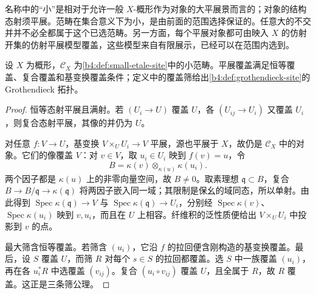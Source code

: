 名称中的“小”是相对于允许一般 \(X\)-概形作为对象的大平展景而言的；对象的结构态射须平展。范畴在集合意义下为小，是由前面的范围选择保证的。任意大的不交并并不必全都属于这个已选范畴。另一方面，每个平展对象都可由映入 \(X\) 的仿射开集的仿射平展模型覆盖，这些模型来自有限展示，已经可以在范围内选到。

\begin{proposition}\label{b4:prop:etale-covering-topology}
	设 \(X\) 为概形，\(\mathcal C_X\) 为\cref{b4:def:small-etale-site}中的小范畴。平展覆盖满足恒等覆盖、复合覆盖和基变换覆盖条件；定义中的覆盖筛给出\cref{b4:def:grothendieck-site}的 Grothendieck 拓扑。
\end{proposition}
\begin{proof}
	恒等态射平展且满射。若 \((U_i\rightarrow U)\) 覆盖 \(U\)，各 \((U_{ij}\rightarrow U_i)\) 又覆盖 \(U_i\)，则复合态射平展，其像的并仍为 \(U\)。

	对任意 \(f:V\rightarrow U\)，基变换 \(V\times_UU_i\rightarrow V\) 平展，源也平展于 \(X\)，故仍是 \(\mathcal C_X\) 中的对象。它们的像覆盖 \(V\)：对 \(v\in V\)，取 \(u_i\in U_i\) 映到 \(f(v)=u\)，令
	\[
		B=\kappa(v)\otimes_{\kappa(u)}\kappa(u_i).
	\]
	两个因子都是 \(\kappa(u)\) 上的非零向量空间，故 \(B\ne0\)。取素理想 \(\mathfrak q\subset B\)，复合 \(B\to B/\mathfrak q\to\kappa(\mathfrak q)\) 将两因子嵌入同一域；其限制是保幺的域同态，所以单射。由此得到 \(\operatorname{Spec}\kappa(\mathfrak q)\to V\) 与 \(\operatorname{Spec}\kappa(\mathfrak q)\to U_i\)，分别经 \(\operatorname{Spec}\kappa(v)\)、\(\operatorname{Spec}\kappa(u_i)\) 映到 \(v,u_i\)，而且在 \(U\) 上相容。纤维积的泛性质便给出 \(V\times_UU_i\) 中投影到 \(v\) 的点。

	最大筛含恒等覆盖。若筛含 \((u_i)\)，它沿 \(f\) 的拉回便含刚构造的基变换覆盖。最后，设 \(S\) 覆盖 \(U\)，而筛 \(R\) 对每个 \(s\in S\) 的拉回都覆盖。选 \(S\) 中一族覆盖 \((u_i)\)，再在各 \(u_i^*R\) 中选覆盖 \((v_{ij})\)。复合 \((u_i\circ v_{ij})\) 覆盖 \(U\)，且全属于 \(R\)，故 \(R\) 覆盖。这正是三条筛公理。
\end{proof}

